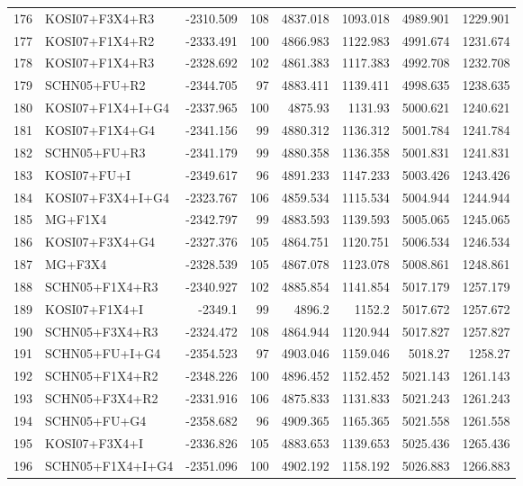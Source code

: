 \begin{longtable}{clrrrrrr}
	176 & KOSI07+F3X4+R3 & -2310.509 & 108 & 4837.018 & 1093.018 & 4989.901 & 1229.901 \\ 
	177 & KOSI07+F1X4+R2 & -2333.491 & 100 & 4866.983 & 1122.983 & 4991.674 & 1231.674 \\ 
	178 & KOSI07+F1X4+R3 & -2328.692 & 102 & 4861.383 & 1117.383 & 4992.708 & 1232.708 \\ 
	179 & SCHN05+FU+R2 & -2344.705 & 97 & 4883.411 & 1139.411 & 4998.635 & 1238.635 \\ 
	180 & KOSI07+F1X4+I+G4 & -2337.965 & 100 & 4875.93 & 1131.93 & 5000.621 & 1240.621 \\ 
	181 & KOSI07+F1X4+G4 & -2341.156 & 99 & 4880.312 & 1136.312 & 5001.784 & 1241.784 \\ 
	182 & SCHN05+FU+R3 & -2341.179 & 99 & 4880.358 & 1136.358 & 5001.831 & 1241.831 \\ 
	183 & KOSI07+FU+I & -2349.617 & 96 & 4891.233 & 1147.233 & 5003.426 & 1243.426 \\ 
	184 & KOSI07+F3X4+I+G4 & -2323.767 & 106 & 4859.534 & 1115.534 & 5004.944 & 1244.944 \\ 
	185 & MG+F1X4 & -2342.797 & 99 & 4883.593 & 1139.593 & 5005.065 & 1245.065 \\ 
	186 & KOSI07+F3X4+G4 & -2327.376 & 105 & 4864.751 & 1120.751 & 5006.534 & 1246.534 \\ 
	187 & MG+F3X4 & -2328.539 & 105 & 4867.078 & 1123.078 & 5008.861 & 1248.861 \\ 
	188 & SCHN05+F1X4+R3 & -2340.927 & 102 & 4885.854 & 1141.854 & 5017.179 & 1257.179 \\ 
	189 & KOSI07+F1X4+I & -2349.1 & 99 & 4896.2 & 1152.2 & 5017.672 & 1257.672 \\ 
	190 & SCHN05+F3X4+R3 & -2324.472 & 108 & 4864.944 & 1120.944 & 5017.827 & 1257.827 \\ 
	191 & SCHN05+FU+I+G4 & -2354.523 & 97 & 4903.046 & 1159.046 & 5018.27 & 1258.27 \\ 
	192 & SCHN05+F1X4+R2 & -2348.226 & 100 & 4896.452 & 1152.452 & 5021.143 & 1261.143 \\ 
	193 & SCHN05+F3X4+R2 & -2331.916 & 106 & 4875.833 & 1131.833 & 5021.243 & 1261.243 \\ 
	194 & SCHN05+FU+G4 & -2358.682 & 96 & 4909.365 & 1165.365 & 5021.558 & 1261.558 \\ 
	195 & KOSI07+F3X4+I & -2336.826 & 105 & 4883.653 & 1139.653 & 5025.436 & 1265.436 \\ 
	196 & SCHN05+F1X4+I+G4 & -2351.096 & 100 & 4902.192 & 1158.192 & 5026.883 & 1266.883 \\ 

\end{longtable}

